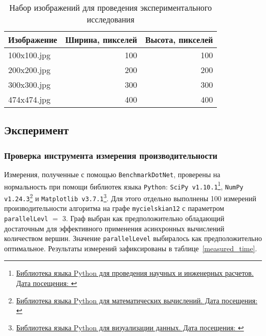 \begin{table}[ht]
\begin{center}
\begin{tabular}{l|r|r|}
\hline
Изображение & Ширина, пикселей & Высота, пикселей \\
\hline
\hline
100x100.jpg                        &      100          &      100  \\
200x200.jpg                        &      200          &      200   \\
300x300.jpg                         &      300          &      300    \\
474x474.jpg                         &      400          &      400    \\
\hline
\end{tabular}
\end{center}
\caption{Набор изображений для проведения экспериментального исследования}
\label{images}
\end{table}



\subsection{Эксперимент}


\subsubsection*{Проверка инструмента измерения производительности}
\noindent  Измерения, полученные с помощью \texttt{BenchmarkDotNet}, проверены на нормальность при помощи библиотек языка \texttt{Python}: \texttt{SciPy v1.10.1}\footnote{\href{https://scipy.org/}{Библиотека языка Python для проведения научных и инженерных расчетов. Дата посещения: }}, \texttt{NumPy v1.24.3}\footnote{\href{https://numpy.org/}{Библиотека языка Python для математических вычислений. Дата посещения: }} и \texttt{Matplotlib v3.7.1}\footnote{\href{https://matplotlib.org/}{Библиотека языка Python для визуализации данных. Дата посещения: }}. Для этого отдельно выполнены 100 измерений производительности алгоритма на графе \texttt{mycielskian12} с параметром \texttt{parallelLevl} $=$ 3. Граф выбран как предположительно обладающий достаточным для эффективного применения асинхронных вычислений количеством вершин. Значение \texttt{parallelLevel} выбиралось как предположительно оптимальное. Результаты измерений зафиксированы в таблице~\ref{measured_time}.

